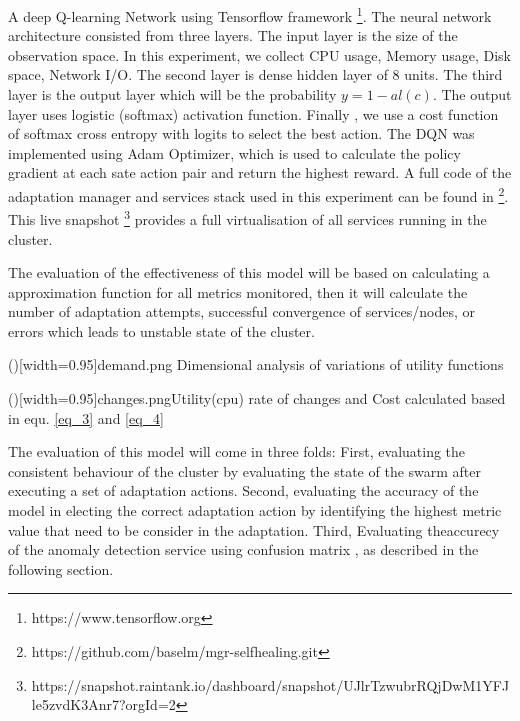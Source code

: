 \documentclass{ieeeaccess}
\begin{document}
A deep Q-learning Network using Tensorflow framework \footnote{https://www.tensorflow.org}. The neural network architecture consisted from three layers. The input layer is the size of the observation space. In this experiment, we collect CPU usage, Memory usage, Disk space, Network I/O. The second layer is dense hidden layer of 8 units. The third layer is the output layer which will be the probability $y= 1-al(c)$. The output layer uses logistic (softmax) activation function. Finally , we use a cost  function of softmax cross entropy with logits to select the best action. The DQN was implemented using Adam Optimizer, which is used to calculate the policy gradient at each sate action pair and return the highest reward. A full code of the adaptation manager and services stack used in this experiment can be found in \footnote{https://github.com/baselm/mgr-selfhealing.git}. This live snapshot \footnote{https://snapshot.raintank.io/dashboard/snapshot/UJlrTzwubrRQjDwM1YFJle5zvdK3Anr7?orgId=2} provides a full virtualisation of all services running in the cluster.  

The evaluation of the effectiveness of this model will be based on calculating a approximation function for all metrics monitored, then it will calculate the number of adaptation attempts, successful convergence of services/nodes, or errors which leads to unstable state of the cluster. 

\Figure[!t]()[width=0.95\textwidth]{demand.png}
   {Dimensional analysis of variations of utility functions \label{fig_demand}}
   
 \Figure[!t]()[width=0.95\textwidth]{changes.png}{Utility(cpu) rate of changes and Cost calculated based in equ. \ref{eq_3} and \ref{eq_4} \label{fig_changes}}
   
  
The evaluation of this model will come in three folds: First, evaluating the consistent behaviour of the cluster by evaluating the state of the swarm after executing a set of adaptation actions. Second, evaluating the accuracy of the model in electing the correct adaptation action by identifying the highest metric value that need to be consider in the adaptation. Third, Evaluating theaccurecy of the anomaly detection service using confusion matrix \cite{kohavi1998confusion},  as described in the following section. 
\end{document}
